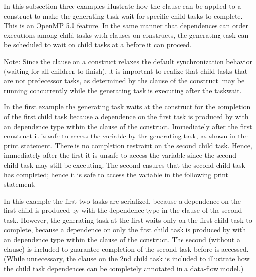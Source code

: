 In this subsection three examples illustrate how the
 clause can be applied to a  construct to make the
generating task wait for specific child tasks to complete. This is an OpenMP 5.0 feature.
 In the same manner that
dependences can order executions among child tasks with  clauses on
 constructs, the generating task can be scheduled to wait on child tasks
at a  before it can proceed.

Note: Since the  clause on a  construct relaxes the
default synchronization behavior (waiting for all children to finish), it is important to
realize that child tasks that are not predecessor tasks, as determined by the 
clause of the  construct, may be running concurrently while the
generating task is executing after the taskwait.

In the first example the generating task waits at the  construct
for the completion of the first child task because a dependence on the first task
is produced by  with an  dependence type within the 
clause of the  construct.
Immediately after the first  construct it is safe to access the
 variable by the generating task, as shown in the print statement.
There is no completion restraint on the second child task.
Hence, immediately after the first  it is unsafe to access the
 variable since the second child task may still be executing.
The second  ensures that the second child task has completed; hence
it is safe to access the  variable in the following print statement.



In this example the first two tasks are serialized, because a dependence on
the first child is produced by  with the  dependence type
in the  clause of the second task.
However, the generating task at the first  waits only on the
first child task to complete, because a dependence on only the first child task
is produced by  with an  dependence type within the
 clause of the  construct.
The second  (without a  clause) is included
to guarantee completion of the second task before  is accessed.
(While unnecessary, the   clause on the  2nd child task is
included to illustrate how the child task dependences can be completely annotated
in a data-flow model.)


